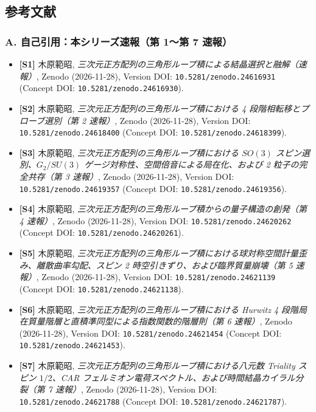\documentclass[
  a4paper,
]{ltjsarticle}
\providecommand{\tightlist}{%
  \setlength{\itemsep}{0pt}\setlength{\parskip}{0pt}}
\begin{document}
\subsection{参考文献}\label{ux53c2ux8003ux6587ux732e}

\subsubsection{A. 自己引用：本シリーズ速報（第 1〜第 7
速報）}\label{a.-ux81eaux5df1ux5f15ux7528ux672cux30b7ux30eaux30fcux30baux901fux5831ux7b2c-1ux7b2c-7-ux901fux5831}

\begin{itemize}
\tightlist
\item
  \textbf{{[}S1{]}} 木原範昭,
  \emph{三次元正方配列の三角形ループ積による結晶選択と融解（速報）},
  Zenodo (2026-11-28), Version DOI: \texttt{10.5281/zenodo.24616931}
  (Concept DOI: \texttt{10.5281/zenodo.24616930}).
\item
  \textbf{{[}S2{]}} 木原範昭,
  \emph{三次元正方配列の三角形ループ積における 4
  段階相転移とプローブ選別（第 2 速報）}, Zenodo (2026-11-28), Version
  DOI: \texttt{10.5281/zenodo.24618400} (Concept DOI:
  \texttt{10.5281/zenodo.24618399}).
\item
  \textbf{{[}S3{]}} 木原範昭,
  \emph{三次元正方配列の三角形ループ積における \(SO(3)\)
  スピン選別、\(G_2/SU(3)\) ゲージ対称性、空間倍音による局在化、および 2
  粒子の完全共存（第 3 速報）}, Zenodo (2026-11-28), Version DOI:
  \texttt{10.5281/zenodo.24619357} (Concept DOI:
  \texttt{10.5281/zenodo.24619356}).
\item
  \textbf{{[}S4{]}} 木原範昭,
  \emph{三次元正方配列の三角形ループ積からの量子構造の創発（第 4
  速報）}, Zenodo (2026-11-28), Version DOI:
  \texttt{10.5281/zenodo.24620262} (Concept DOI:
  \texttt{10.5281/zenodo.24620261}).
\item
  \textbf{{[}S5{]}} 木原範昭,
  \emph{三次元正方配列の三角形ループ積における球対称空間計量歪み、離散曲率勾配、スピン
  2 時空引きずり、および臨界質量崩壊（第 5 速報）}, Zenodo (2026-11-28),
  Version DOI: \texttt{10.5281/zenodo.24621139} (Concept DOI:
  \texttt{10.5281/zenodo.24621138}).
\item
  \textbf{{[}S6{]}} 木原範昭,
  \emph{三次元正方配列の三角形ループ積における Hurwitz 4
  段階局在質量階層と直積準同型による指数関数的階層則（第 6 速報）},
  Zenodo (2026-11-28), Version DOI: \texttt{10.5281/zenodo.24621454}
  (Concept DOI: \texttt{10.5281/zenodo.24621453}).
\item
  \textbf{{[}S7{]}} 木原範昭,
  \emph{三次元正方配列の三角形ループ積における八元数 Triality スピン
  \(1/2\)、CAR
  フェルミオン電荷スペクトル、および時間結晶カイラル分裂（第 7 速報）},
  Zenodo (2026-11-28), Version DOI: \texttt{10.5281/zenodo.24621788}
  (Concept DOI: \texttt{10.5281/zenodo.24621787}).
\end{itemize}
\end{document}

